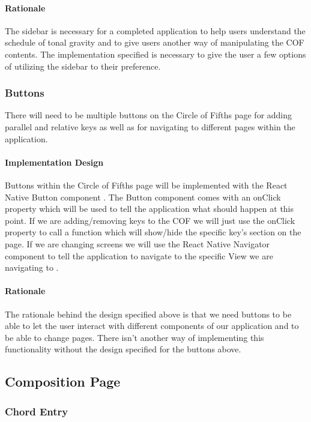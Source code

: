 \documentclass[onecolumn, draftclsnofoot,10pt, compsoc]{IEEEtran}
\begin{document}
\paragraph{Rationale}
The sidebar is necessary for a completed application to help users understand the schedule of tonal gravity and to give users another way of manipulating the COF contents.
The implementation specified is necessary to give the user a few options of utilizing the sidebar to their preference.
	
\subsubsection{Buttons}
There will need to be multiple buttons on the Circle of Fifths page for adding parallel and relative keys as well as for navigating to different pages within the application.

\paragraph{Implementation Design}
Buttons within the Circle of Fifths page will be implemented with the React Native Button component \cite{react-button}.
The Button component comes with an onClick property which will be used to tell the application what should happen at this point.
If we are adding/removing keys to the COF we will just use the onClick property to call a function which will show/hide the specific key’s section on the page.
If we are changing screens we will use the React Native Navigator component to tell the application to navigate to the specific View we are navigating to \cite{react-navigators}.

\paragraph{Rationale}
The rationale behind the design specified above is that we need buttons to be able to let the user interact with different components of our application and to be able to change pages. 
There isn’t another way of implementing this functionality without the design specified for the buttons above.

\subsection{Composition Page}
\subsubsection{Chord Entry}
\end{document}
